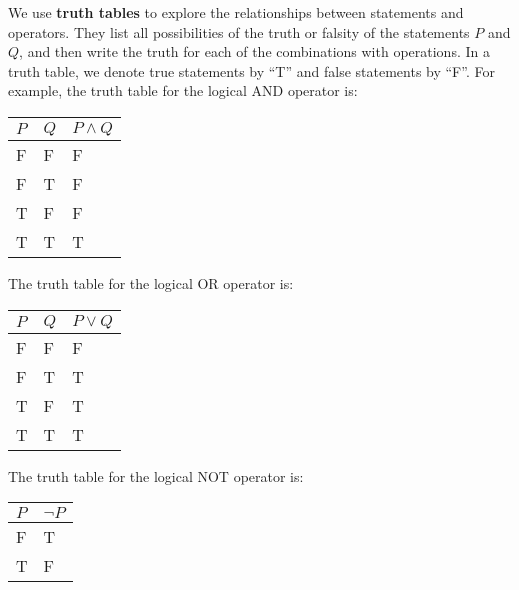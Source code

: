 We use \textbf{truth tables} to explore the relationships between statements and operators. They list all possibilities of the truth or falsity of the statements $P$ and $Q$, and then write the truth for each of the combinations with operations. In a truth table, we denote true statements by ``T'' and false statements by ``F''. For example, the truth table for the logical AND operator is:
\begin{table}[h]
    \centering
    \begin{tabular}{|l|l||l|}
        \hline
        $P$ & $Q$ & $P\land Q$ \\ \hline
        F   & F   & F          \\ \hline
        F   & T   & F          \\ \hline
        T   & F   & F          \\ \hline
        T   & T   & T          \\ \hline
    \end{tabular}
\end{table}

The truth table for the logical OR operator is:
\begin{table}[h]
    \centering
    \begin{tabular}{|l|l||l|}
        \hline
        $P$ & $Q$ & $P\lor Q$ \\ \hline
        F   & F   & F         \\ \hline
        F   & T   & T         \\ \hline
        T   & F   & T         \\ \hline
        T   & T   & T         \\ \hline
    \end{tabular}
\end{table}

\newpage

The truth table for the logical NOT operator is:
\begin{table}[h]
    \centering
    \begin{tabular}{|l||l|}
        \hline
        $P$ & $\lnot P$ \\ \hline
        F   & T         \\ \hline
        T   & F         \\ \hline
    \end{tabular}
\end{table}

